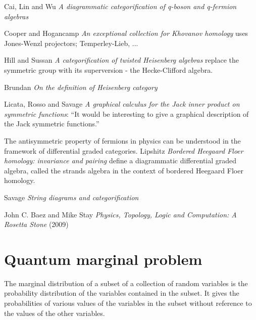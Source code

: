 \begin{description}
Cai, Lin and Wu
{\em A diagrammatic categorification of q-boson and q-fermion algebras}

Cooper and Hogancamp
{\em An exceptional collection for {Khovanov} homology} uses
Jones-Wenzl projectors; Temperley-Lieb, ...

Hill and Sussan {\em A categorification of twisted
{Heisenberg} algebras}
replace the symmetric group with its superversion - the Hecke-Clifford
algebra.


Brundan {\em On the definition of {Heisenberg} category}

Licata, Rosso and Savage {\em A graphical calculus for the
{Jack} inner product on symmetric functions}: ``It would be interesting to
give a graphical description of the Jack symmetric functions.''

The antisymmetric property of fermions in physics can be understood in
the framework of differential graded categories.
Lipshitz \etal{} {\em Bordered Heegaard Floer homology:
invariance and pairing} define a diagrammatic differential graded
algebra, called the strands algebra in the context of bordered Heegaard
Floer homology.

Savage {\em String diagrams and categorification}

John C. Baez and Mike Stay
{\em Physics, Topology, Logic and Computation:
 {A Rosetta Stone}} (2009)


\end{description}

\newpage
\section{Quantum marginal problem}
\label{s-QMP}

The
 {marginal
distribution} of a subset of a collection of random variables is the
probability distribution of the variables contained in the subset. It gives
the probabilities of various values of the variables in the subset without
reference to the values of the other variables.

